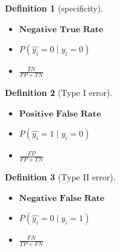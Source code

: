 \documentclass{article}
\theoremstyle{MyNonumberplain}
\theoremstyle{break}
\theoremstyle{break}
\newtheorem{definition}{Definition}[section]
\begin{document}
\begin{defbox}
    \begin{definition}[specificity]
        \begin{itemize}
            below are things equivalent to specificity:
            \item $\textbf{Negative True Rate}$
            \item $P(\hat{y_i} = 0 \mid y_i = 0)$
            \item $\frac{TN}{FP + TN}$
        \end{itemize}
    \end{definition}
\end{defbox}

\begin{defbox}
    \begin{definition}[Type I error]
        \begin{itemize}
            below are things equivalent to Type I error:
            \item $\textbf{Positive False Rate}$
            \item $P(\hat{y_i} = 1 \mid y_i = 0)$
            \item $\frac{FP}{FP + TN}$
        \end{itemize}
    \end{definition}
\end{defbox}

\begin{defbox}
    \begin{definition}[Type II error]
        \begin{itemize}
            below are things equivalent to Type II error:
            \item $\textbf{Negative False Rate}$
            \item $P(\hat{y_i} = 0 \mid y_i = 1)$
            \item $\frac{FN}{TP + FN}$
        \end{itemize}
    \end{definition}
\end{defbox}
\end{document}
